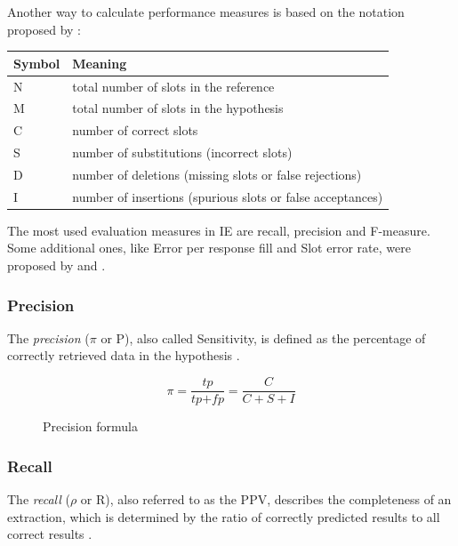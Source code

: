 Another way to calculate performance measures is based on the notation proposed by \citeauthor{Makhoul:1999} \cite{Makhoul:1999}:

\begin{table}[H]
\centering
\begin{tabular*}{\textwidth}{ll}
	\toprule
	\textbf{Symbol} & \textbf{Meaning} \\
	\midrule
	N & total number of slots in the reference \\
	M & total number of slots in the hypothesis \\
	C & number of correct slots \\
	S & number of substitutions (incorrect slots) \\
	D & number of deletions (missing slots or false rejections) \\
	I & number of insertions (spurious slots or false acceptances) \\
	\bottomrule
\end{tabular*}
\end{table}

The most used evaluation measures in \gls{IE} are recall, precision and F-measure. Some additional ones, like Error per response fill and  Slot error rate, were proposed by \cite{Chinchor:1995} and \cite{Makhoul:1999}.

\subsubsection{Precision}
The \textit{precision} (\ensuremath{\pi} or P), also called Sensitivity, is defined as the percentage of correctly retrieved data in the hypothesis \cite{Carstensen:2010}. 

\begin{figure}[H]
\begin{displaymath}
	\pi = \frac{\textit{tp}}{\textit{tp} + \textit{fp}} = \frac{C}{C+S+I}
\end{displaymath}
\caption{Precision formula}
\end{figure}

\subsubsection{Recall}
The \textit{recall} (\ensuremath{\rho} or R), also referred to as the \gls{PPV}, describes the completeness of an extraction, which is determined by the ratio of correctly predicted results to all correct results \cite{Carstensen:2010}.


